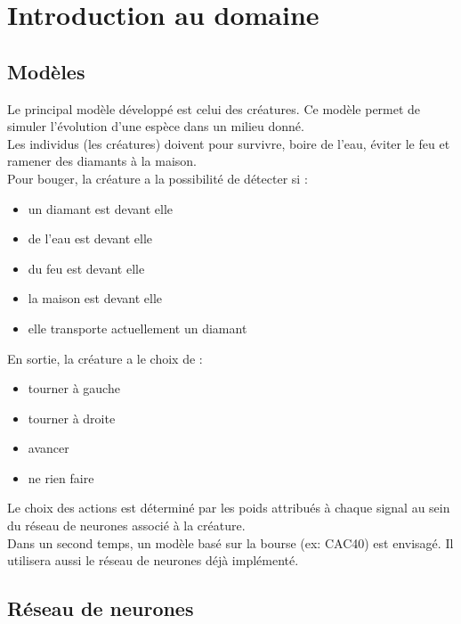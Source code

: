 \chapter{Introduction au domaine}

\section{Modèles}
Le principal modèle développé est celui des créatures.
Ce modèle permet de simuler l'évolution d'une espèce dans un milieu donné.\\
Les individus (les créatures) doivent pour survivre, boire de l'eau, éviter le feu et ramener des diamants à la maison.
\\Pour bouger, la créature a la possibilité de détecter si :\\

\begin{itemize}
 \item un diamant est devant elle
 \item de l'eau est devant elle
 \item du feu est devant elle
 \item la maison est devant elle
 \item elle transporte actuellement un diamant\\
\end{itemize}

En sortie, la créature a le choix de :
\begin{itemize}
 \item tourner à gauche
 \item tourner à droite
 \item avancer
 \item ne rien faire\\
 
\end{itemize}
 
Le choix des actions est déterminé par les poids attribués à chaque signal au sein du réseau de neurones associé à la créature.\\

Dans un second temps, un modèle basé sur la bourse (ex: CAC40) est envisagé.
Il utilisera aussi le réseau de neurones déjà implémenté.
\clearpage




\section{Réseau de neurones}

